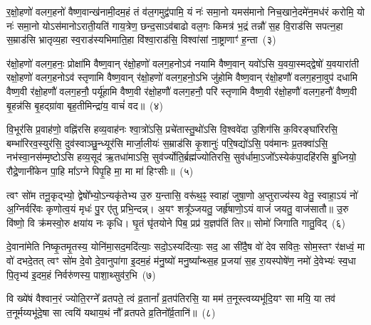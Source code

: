 {\anuvakamend[{द्वेष॑ इ॒मा अ॒ष्टाद॑श च}]}%

र॒क्षो॒हणो॑ वलग॒हनो॑ वैष्ण॒वान्ख॑नामी॒दम॒हं तं व॑ल॒गमुद्व॑पामि॒ यं नः॑ समा॒नो यमस॑मानो निच॒खाने॒दमे॑न॒मध॑रं करोमि॒ यो नः॑ समा॒नो यो\-ऽस॑मानो\-ऽराती॒यति॑ गाय॒त्रेण॒ छन्द॒सा\-ऽव॑बाढो वल॒गः किमत्र॑ भ॒द्रं तन्नौ॑ स॒ह वि॒राड॑सि सपत्न॒हा स॒म्राड॑सि भ्रातृव्य॒हा स्व॒राड॑स्यभिमाति॒हा वि॑श्वा॒राड॑सि॒ विश्वा॑सां ना॒ष्ट्राणाꣳ॑ ह॒न्ता~(३)

र॑क्षो॒हणो॑ वलग॒हनः॒ प्रोक्षा॑मि वैष्ण॒वान् र॑क्षो॒हणो॑ वलग॒हनो\-ऽव॑ नयामि वैष्ण॒वान् यवो॑\-ऽसि य॒वया॒स्मद्द्वेषो॑ य॒वयारा॑ती रक्षो॒हणो॑ वलग॒हनो\-ऽव॑ स्तृणामि वैष्ण॒वान् र॑क्षो॒हणो॑ वलग॒हनो॒\-ऽभि जु॑होमि वैष्ण॒वान् र॑क्षो॒हणौ॑ वलग॒हना॒वुप॑ दधामि वैष्ण॒वी र॑क्षो॒हणौ॑ वलग॒हनौ॒ पर्यू॑हामि वैष्ण॒वी र॑क्षो॒हणौ॑ वलग॒हनौ॒ परि॑ स्तृणामि वैष्ण॒वी र॑क्षो॒हणौ॑ वलग॒हनौ॑ वैष्ण॒वी बृ॒हन्न॑सि बृ॒हद्ग्रा॑वा बृह॒तीमिन्द्रा॑य॒ वाचं॑ वद॥~(४)

{\anuvakamend[{ह॒न्तेन्द्रा॑य॒ द्वे च॑}]}%

वि॒भूर॑सि प्र॒वाह॑णो॒ वह्नि॑रसि हव्य॒वाह॑नः श्वा॒त्रो॑\-ऽसि॒ प्रचे॑तास्तु॒थो॑\-ऽसि वि॒श्ववे॑दा उ॒शिग॑सि क॒विरङ्घा॑रिरसि॒ बम्भा॑रिरव॒स्युर॑सि॒ दुव॑स्वाञ्छु॒न्ध्यूर॑सि मार्जा॒लीयः॑ स॒म्राड॑सि कृ॒शानुः॑ परि॒षद्यो॑\-ऽसि॒ पव॑मानः प्र॒तक्वा॑\-ऽसि॒ नभ॑स्वा॒नस॑म्मृष्टो\-ऽसि हव्य॒सूद॑ ऋ॒तधा॑मा\-ऽसि॒ सुव॑र्ज्योति॒र्ब्रह्म॑ज्योतिरसि॒ सुव॑र्धामा॒\-ऽजो᳚\-ऽस्येक॑पा॒दहि॑रसि बु॒ध्नियो॒ रौद्रे॒णानी॑केन पा॒हि मा᳚\-ऽग्ने पिपृ॒हि मा॒ मा मा॑ हिꣳसीः॥~(५)

{\anuvakamend[{अनी॑केना॒ष्टौ च॑}]}%

त्वꣳ सो॑म तनू॒कृद्भ्यो॒ द्वेषो᳚भ्यो॒\-ऽन्यकृ॑तेभ्य उ॒रु य॒न्तासि॒ वरू॑थ॒ꣴ॒ स्वाहा॑ जुषा॒णो अ॒प्तुराज्य॑स्य वेतु॒ स्वाहा॒\-ऽयं नो॑ अ॒ग्निर्वरि॑वः कृणोत्व॒यं मृधः॑ पु॒र ए॑तु प्रभि॒न्दन्न्। अ॒यꣳ शत्रू᳚ञ्जयतु॒ जर्\mbox{}हृ॑षाणो॒\-ऽयं वाजं॑ जयतु॒ वाज॑सातौ॥ उ॒रु वि॑ष्णो॒ वि क्र॑मस्वो॒रु क्षया॑य नः कृधि। घृ॒तं घृ॑तयोने पिब॒ प्रप्र॑ य॒ज्ञप॑तिं तिर॥ सोमो॑ जिगाति गातु॒विद्~(६)

दे॒वाना॑मेति निष्कृ॒तमृ॒तस्य॒ योनि॑मा॒सद॒मदि॑त्याः॒ सदो॒\-ऽस्यदि॑त्याः॒ सद॒ आ सी॑दै॒ष वो॑ देव सवितः॒ सोम॒स्तꣳ र॑क्षध्वं॒ मा वो॑ दभदे॒तत् त्वꣳ सो॑म दे॒वो दे॒वानुपा॑गा इ॒दम॒हं म॑नु॒ष्यो॑ मनु॒ष्या᳚न्थ्स॒ह प्र॒जया॑ स॒ह रा॒यस्पोषे॑ण॒ नमो॑ दे॒वेभ्यः॑ स्व॒धा पि॒तृभ्य॑ इ॒दम॒हं निर्वरु॑णस्य॒ पाशा॒थ्सुव॑र॒भि~(७)

वि ख्ये॑षं वैश्वान॒रं ज्योति॒रग्ने᳚ व्रतपते॒ त्वं व्र॒तानां᳚ व्र॒तप॑तिरसि॒ या मम॑ त॒नूस्त्वय्यभू॑दि॒यꣳ सा मयि॒ या तव॑ त॒नूर्मय्यभू॑दे॒षा सा त्वयि॑ यथाय॒थं नौ᳚ व्रतपते व्र॒तिनो᳚र्व्र॒तानि॑॥~(८)

